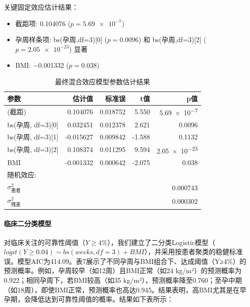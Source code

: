\documentclass[withoutpreface]{cumcmthesis}
\begin{document}
关键固定效应估计结果：
\begin{itemize}
  \item 截距项: \num{0.104076} ($p = \num{5.69e-7}$)
  \item 孕周样条项: bs(孕周,df=3)[0] ($p = \num{0.0096}$) 和 bs(孕周,df=3)[2] ($p = \num{2.05e-23}$) 显著
  \item BMI: \num{-0.001332} ($p = \num{0.038}$)
\end{itemize}

\begin{table}[htbp]
  \centering
  \caption{最终混合效应模型参数估计结果}
  \label{tab:params}
  \begin{tabular}{@{}lrrrr@{}}
    \toprule
    参数 & 估计值 & 标准误 & t值 & p值 \\
    \midrule
    (截距) & 0.104076 & 0.018752 & 5.550 & \num{5.69e-7} \\
    bs(孕周, df=3)[0] & 0.032451 & 0.012378 & 2.621 & 0.0096 \\
    bs(孕周, df=3)[1] & -0.015627 & 0.009842 & -1.588 & 0.1132 \\
    bs(孕周, df=3)[2] & 0.108374 & 0.011295 & 9.594 & \num{2.05e-23} \\
    BMI & -0.001332 & 0.000642 & -2.075 & 0.038 \\
    \midrule
    \multicolumn{5}{l}{随机效应:}\\
    $\sigma^2_{\text{患者}}$ & \multicolumn{4}{r}{0.000743}\\
    $\sigma^2_{\text{残差}}$ & \multicolumn{4}{r}{0.000302}\\
    \bottomrule
  \end{tabular}
\end{table}



\paragraph{临床二分类模型}

对临床关注的可靠性阈值（$Y ≥ 4\% $），我们建立了二分类Logistic模型（$logit(Y≥0.04) \sim bs(weeks, df=3) + BMI$），并采用按患者聚类的稳健标准误。模型AIC为414.09。表7展示了不同孕周与BMI组合下、达成阈值（Y≥4\%）的预测概率。例如，孕周较早（如12周）且BMI正常（如24 kg/m²）的预测概率为0.922；相同孕周下，若BMI较高（如35 kg/m²），预测概率降至0.760；至孕中期（如18周），即使BMI正常，预测概率也高达0.945。结果表明，高BMI尤其是在早孕期，会降低达到可靠性阈值的概率。结果如下表所示：
\end{document}
